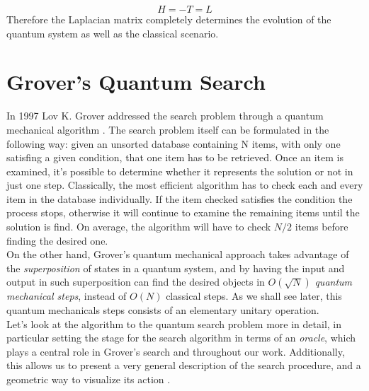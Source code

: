 \begin{equation}
  H = -T = L
  \label{qw_hamiltonian}
\end{equation}
Therefore the Laplacian matrix completely determines the evolution of the quantum system as well as the classical scenario.



\section{Grover's Quantum Search}\label{sec:grover search}
In 1997 Lov K. Grover addressed the search problem through a quantum mechanical algorithm \cite{Grover1997}. The search problem itself can be formulated in the following way: given an unsorted database containing N items, with only one satisfing a given condition, that one item has to be retrieved. Once an item is examined, it's possible to determine whether it represents the solution or not in just one step.
Classically, the most efficient algorithm has to check each and every item in the database individually. If the item checked satisfies the condition the process stops, otherwise it will continue to examine the remaining items until the solution is find. On average, the algorithm will have to check $N/2$ items before finding the desired one.\\On the other hand, Grover's quantum mechanical approach takes advantage of the \textit{superposition} of states in a quantum system, and by having the input and output in such superposition can find the desired objects in $O(\sqrt{N})$ \textit{quantum mechanical steps}, instead of $O(N)$ classical steps. As we shall see later, this quantum mechanicals steps consists of an elementary unitary operation. \\

\noindent
Let's look at the algorithm to the quantum search problem more in detail, in particular setting the stage for the search algorithm in terms of an \textit{oracle}, which plays a central role in Grover's search and throughout our work. Additionally, this allows us to present a very general description of the search procedure, and a geometric way to visualize its action \cite{Nielsen2000}. \\

